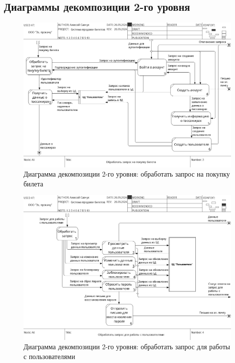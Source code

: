 \newpage
\subsection{Диаграммы декомпозиции 2-го уровня}

\begin{figure}[H]
    \centering
    \includegraphics[width=\linewidth]{model/A2-1.png}
    \caption{Диаграмма декомпозиции 2-го уровня: обработать запрос на покупку билета}
\end{figure}

\newpage
\begin{figure}[H]
    \centering
    \includegraphics[width=\linewidth]{model/A2-2.png}
    \caption{Диаграмма декомпозиции 2-го уровня: обработать запрос для работы с пользователями}
\end{figure}
